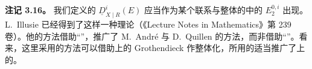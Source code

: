 \textbf{注记 3.16。} 我们定义的 $\underline D^i_{X\mid R}(E)$ 应当作为某个联系与整体的中的 $E_2^{0,i}$ 出现。L.~Illusie 已经得到了这样一种理论（《Lecture Notes in Mathematics》第 239 卷）。他的方法借助“”，推广了 M.~André 与 D.~Quillen 的方法，而非借助“”。看来，这里采用的方法可以借助上的 Grothendieck 作整体化，所用的适当推广了上的。
